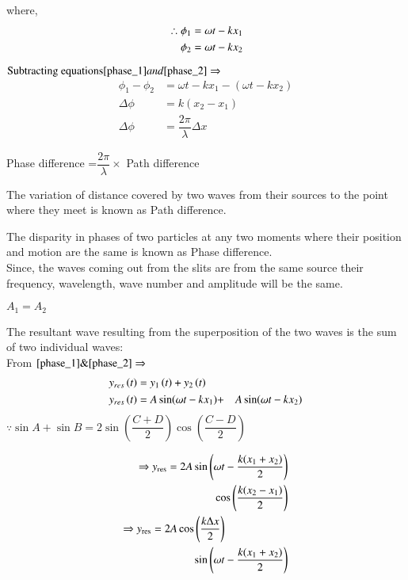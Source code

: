 \documentclass[journal,12pt,twocolumn]{IEEEtran}
\theoremstyle{remark}
\begin{document}
where,
\begin{align}
 \therefore \phi_1 &= \omega t - kx_1 \\
\hspace*{0.4cm} \phi_2 &= \omega t - kx_2 
\end{align}

$ \text{Subtracting equations} \eqref{phase_1} and \eqref{phase_2} \Rightarrow{}$
\begin{align}
   \phi_1 - \phi_2 &= \omega t - kx_1 -( \omega t - kx_2 ) \nonumber \\ 
   \Delta \phi &= k(x_2 - x_1) \nonumber \\ 
    \Delta \phi &= \dfrac{2\pi}{\lambda}\Delta x  \label{relation }
\end{align}

\hspace{0.3cm} Phase difference =$\dfrac{2\pi}{\lambda} \times$ Path difference

\vspace{0.2cm}

The variation of distance covered by two waves from their sources to the point where they meet is known as Path difference.

The disparity in phases of two particles at any two moments where their position and motion are the same is known as Phase difference. \\
\hspace*{0.8cm} Since, the waves coming out from the slits are from the same source their frequency, wavelength, wave number and amplitude will be the same. 
\begin{center}
    $A_1 = A_2$ \\
\end{center} 
The resultant wave resulting from the superposition of the two waves is the sum of two individual waves: \\
From $\eqref{phase_1} \& \eqref{phase_2} \Rightarrow$
\begin{align}
y_{res}\left(t\right) &= y_1\left(t\right) + y_2\left(t\right)  \\
y_{res}\left(t\right) &= A\sin({\omega t - kx_1})  + &A\sin({ \omega t - kx_2}) \nonumber 
\end{align}
 $ \because \sin{A} + \sin{B} = 2\sin\left(\dfrac{C+D}{2}\right) \cos\left(\dfrac{C-D}{2}\right) $ 
 
\begin{align}
\Rightarrow y_\text{res} =  2A\sin\left( \omega t - \dfrac{k(x_1+x_2)}{2} \right) \nonumber \\
\quad\cos\left(\dfrac{k(x_2 - x_1)}{2}\right) \\
 \Rightarrow y_\text{res} =  2A\cos\left(\dfrac{k\Delta x}{2}\right) \nonumber \hspace*{2cm} \\ \quad \sin\left(\omega t - \dfrac{k(x_1+x_2)}{2} \right) 
 \end{align}
\end{document}
